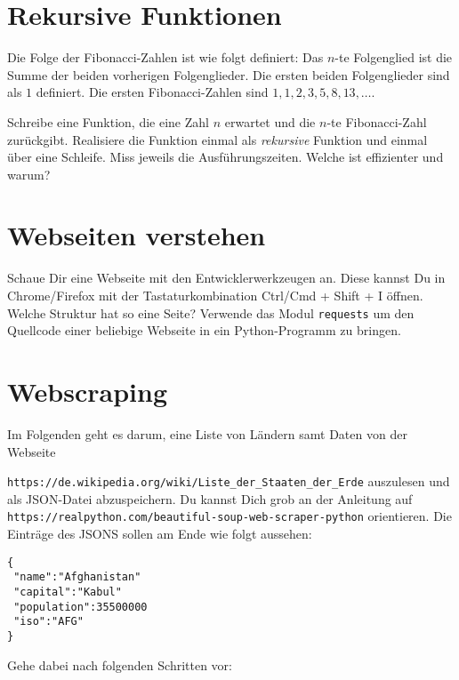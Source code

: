 \documentclass[a4paper]{article}
\newcommand{\pybw}[1]{\texttt{#1}}
\begin{document}




\section{Rekursive Funktionen}
Die Folge der Fibonacci-Zahlen ist wie folgt definiert: Das $n$-te Folgenglied ist die Summe der beiden vorherigen Folgenglieder. Die ersten beiden Folgenglieder sind als $1$ definiert. Die ersten Fibonacci-Zahlen sind $1,1,2,3,5,8,13,\dots$. 

\vspace{2pt}

Schreibe eine Funktion, die eine Zahl $n$ erwartet und die $n$-te Fibonacci-Zahl zurückgibt. Realisiere die Funktion einmal als \emph{rekursive} Funktion und einmal über eine Schleife. Miss jeweils die Ausführungszeiten. Welche ist effizienter und warum? 

\section{Webseiten verstehen}
Schaue Dir eine Webseite mit den Entwicklerwerkzeugen an. Diese kannst Du in Chrome/Firefox mit der Tastaturkombination  Ctrl/Cmd + Shift + I öffnen. Welche Struktur hat so eine Seite? 
Verwende das Modul \pybw{requests} um den Quellcode einer beliebige Webseite in ein Python-Programm zu bringen.  


\section{Webscraping}
Im Folgenden geht es darum, eine Liste von Ländern samt Daten von der Webseite 

\texttt{https://de.wikipedia.org/wiki/Liste\_der\_Staaten\_der\_Erde} auszulesen und als JSON-Datei abzuspeichern. Du kannst Dich grob an der Anleitung auf \texttt{https://realpython.com/beautiful-soup-web-scraper-python} orientieren. 
Die Einträge des JSONS sollen am Ende wie folgt aussehen: 

\begin{verbatim}
{
 "name":"Afghanistan"
 "capital":"Kabul"
 "population":35500000
 "iso":"AFG"
}
\end{verbatim}

Gehe dabei nach folgenden Schritten vor: 
\end{document}
